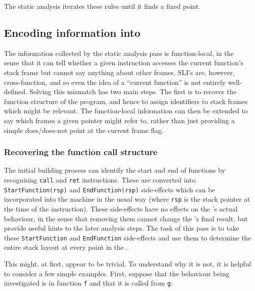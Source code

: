 The static analysis iterates these rules until it finds a fixed point.

\subsection{Encoding information into \StateMachines}

The information collected by the static analysis pass is
function-local, in the sense that it can tell whether a given
instruction accesses the current function's stack frame but cannot say
anything about other frames.  SLI's \StateMachines are, however,
cross-function, and so even the idea of a ``current function'' is not
entirely well-defined.  Solving this mismatch has two main steps.  The
first is to recover the function structure of the program, and hence
to assign identifiers to stack frames which might be relevant.  The
function-local information can then be extended to say which frames a
given pointer might refer to, rather than just providing a simple
does/does-not point at the current frame flag.

\subsubsection{Recovering the function call structure}


The initial \StateMachine building process can identify the start and
end of functions by recognising \verb|call| and \verb|ret|
instructions.  These are converted into \verb|StartFunction(rsp)| and
\verb|EndFunction(rsp)| side-effects which can be incorporated into
the machine in the usual way (where \verb|rsp| is the stack pointer at
the time of the instruction).  These side-effects have no effects on
the \StateMachine's actual behaviour, in the sense that removing them
cannot change the \StateMachine's final result, but provide useful
hints to the later analysis steps.  The task of this pass is to take
these \verb|StartFunction| and \verb|EndFunction| side-effects and use
them to determine the entire stack layout at every point in the
\StateMachine.

This might, at first, appear to be trivial.  To understand why it is
not, it is helpful to consider a few simple examples.  First, suppose
that the behaviour being investigated is in function \verb|f| and that
it is called from \verb|g|:

